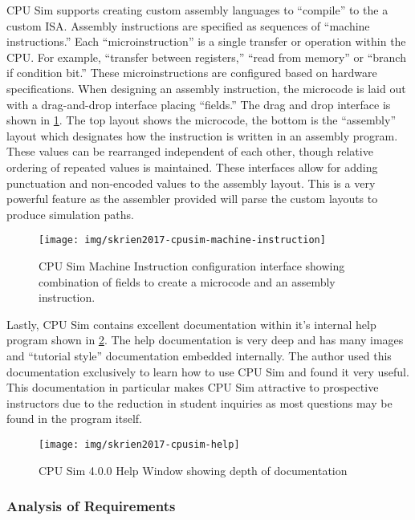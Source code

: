 CPU Sim supports creating custom assembly languages to ``compile'' to the a custom ISA. Assembly instructions are specified as sequences of ``machine instructions.'' Each ``microinstruction'' is a single transfer or operation within the CPU. For example, ``transfer between registers,'' ``read from memory'' or ``branch if condition bit.'' These microinstructions are configured based on hardware specifications. When designing an assembly instruction, the microcode is laid out with a drag-and-drop interface placing ``fields.'' The drag and drop interface is shown in \cref{fig:skrien2017-cpusim-machine-instruction}. The top layout shows the microcode, the bottom is the ``assembly'' layout which designates how the instruction is written in an assembly program. These values can be rearranged independent of each other, though relative ordering of repeated values is maintained. These interfaces allow for adding punctuation and non-encoded values to the assembly layout. This is a very powerful feature as the assembler provided will parse the custom layouts to produce simulation paths.

\begin{figure}[t!]
    \centering
    \texttt{[image: img/skrien2017-cpusim-machine-instruction]}
    \caption{CPU Sim Machine Instruction configuration interface showing combination of fields to create a microcode and an assembly instruction.}
    \label{fig:skrien2017-cpusim-machine-instruction}
\end{figure}

Lastly, CPU Sim contains excellent documentation within it's internal help program shown in \cref{fig:skrien2017-cpusim-help}. The help documentation is very deep and has many images and ``tutorial style'' documentation embedded internally. The author used this documentation exclusively to learn how to use CPU Sim and found it very useful. This documentation in particular makes CPU Sim attractive to prospective instructors due to the reduction in student inquiries as most questions may be found in the program itself. 

\begin{figure}[hb!]
    \centering
    \texttt{[image: img/skrien2017-cpusim-help]}
    \caption{CPU Sim 4.0.0 Help Window showing depth of documentation \cite{Skrien2017}}
    \label{fig:skrien2017-cpusim-help}
\end{figure}

\subsubsection*{Analysis of Requirements}


